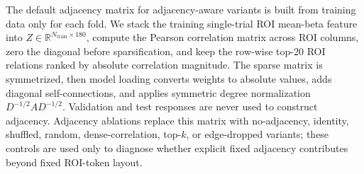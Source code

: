 \documentclass{article}
\begin{document}
The default adjacency matrix for adjacency-aware variants is built from training data only for each fold. We stack the training single-trial ROI mean-beta feature into $Z\in\mathbb{R}^{N_{\mathrm{train}}\times180}$, compute the Pearson correlation matrix across ROI columns, zero the diagonal before sparsification, and keep the row-wise top-20 ROI relations ranked by absolute correlation magnitude. The sparse matrix is symmetrized, then model loading converts weights to absolute values, adds diagonal self-connections, and applies symmetric degree normalization $D^{-1/2}AD^{-1/2}$. Validation and test responses are never used to construct adjacency. Adjacency ablations replace this matrix with no-adjacency, identity, shuffled, random, dense-correlation, top-$k$, or edge-dropped variants; these controls are used only to diagnose whether explicit fixed adjacency contributes beyond fixed ROI-token layout.
\end{document}
